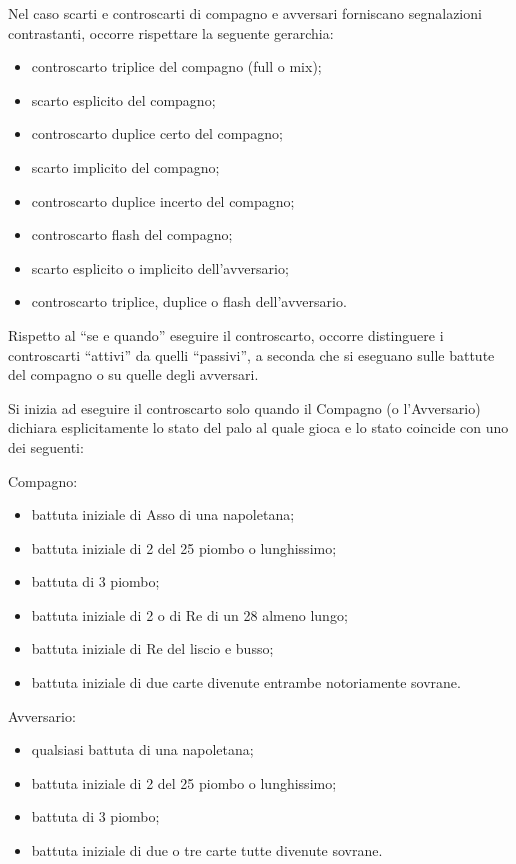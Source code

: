 \documentclass[italian,a4paper]{article}
\newenvironment{packeditem}{
\begin{itemize}
  \setlength{\itemsep}{1pt}
  \setlength{\parskip}{0pt}
  \setlength{\parsep}{0pt}
}{\end{itemize}}
\begin{document}
Nel caso scarti e controscarti di compagno e avversari forniscano segnalazioni contrastanti, occorre rispettare la seguente gerarchia:
\begin{packeditem}
\item controscarto triplice del compagno (full o mix);
\item scarto esplicito del compagno;
\item controscarto duplice certo del compagno;
\item scarto implicito del compagno;
\item controscarto duplice incerto del compagno;
\item controscarto flash del compagno;
\item scarto esplicito o implicito dell'avversario;
\item controscarto triplice, duplice o flash dell'avversario.
\end{packeditem}
 
Rispetto al ``se e quando'' eseguire il controscarto, occorre
distinguere i controscarti ``attivi'' da quelli ``passivi'', a seconda che
si eseguano sulle battute del compagno o su quelle degli
avversari.

Si inizia ad eseguire il controscarto solo quando il Compagno (o l'Avversario) dichiara esplicitamente lo stato del palo al quale gioca e lo stato coincide con uno dei seguenti:
 
Compagno:
\begin{packeditem}
\item         battuta iniziale di Asso di una napoletana;
\item         battuta iniziale di 2 del 25 piombo o lunghissimo;
\item         battuta di 3 piombo;
\item         battuta iniziale di 2 o di Re di un 28 almeno lungo;
\item         battuta iniziale di Re del liscio e busso;
\item         battuta iniziale di due carte divenute entrambe notoriamente sovrane. 
\end{packeditem}
 
Avversario:
\begin{packeditem}
\item         qualsiasi battuta di una napoletana;
\item         battuta iniziale di 2 del 25 piombo o lunghissimo;
\item         battuta di 3 piombo;
\item         battuta iniziale di due o tre carte tutte divenute sovrane.
\end{packeditem}
\end{document}
